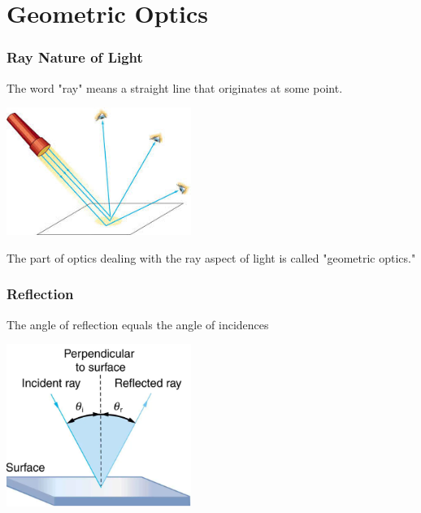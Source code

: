 \documentclass{beamer}
\begin{document}
\section{Geometric Optics}

\begin{frame}\frametitle{Ray Nature of Light}
The word "ray" means a straight line that originates at some point.

\begin{center}
\includegraphics[width=6cm]{fig/rays.jpg}
\end{center}

The part of optics dealing with the ray aspect of light is called "geometric optics."

\end{frame}


\begin{frame}\frametitle{Reflection}
The angle of reflection equals the angle of incidences

\begin{center}
\includegraphics[width=6cm]{fig/reflect.png}
\end{center}

\end{frame}
\end{document}
